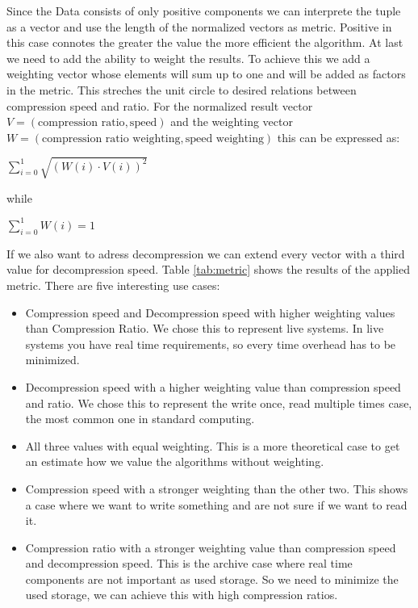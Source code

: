 \documentclass[
	12pt,
	a4paper,
	BCOR10mm,
	DIV14,
	listof=totoc,
	bibliography=totoc,
	headsepline
]{scrreprt}
\begin{document}
Since the Data consists of only positive components we can interprete the tuple as a vector and use the length of the normalized vectors as metric. 
Positive in this case connotes the greater the value the more efficient the algorithm.
At last we need to add the ability to weight the results. 
To achieve this we add a weighting vector whose elements will sum up to one and will be added as factors in the metric. 
This streches the unit circle to desired relations between compression speed and ratio.
For the normalized result vector \(V = (\text{compression ratio}, \text{speed})\) and the weighting vector \(W = (\text{compression ratio weighting}, \text{speed weighting})\) this can be expressed as:
\begin{center}
	\(
	\sum\limits^{1}_{i=0} \sqrt{(W(i) \cdot V(i))^2}
	\)
\end{center}
while
\begin{center}
	\(
	\sum\limits^{1}_{i=0}W(i) = 1
	\)
\end{center}
If we also want to adress decompression we can extend every vector with a third value for decompression speed.
Table \ref{tab:metric} shows the results of the applied metric.
There are five interesting use cases:
\begin{itemize}
	\item Compression speed and Decompression speed with higher weighting values than Compression Ratio.
	We chose this to represent live systems.  
	In live systems you have real time requirements, so every time overhead has to be minimized. 
	\\
	\item Decompression speed with a higher weighting value than compression speed and ratio.
	We chose this to represent the write once, read multiple times case, the most common one in standard computing.
	\item All three values with equal weighting.
	This is a more theoretical case to get an estimate how we value the algorithms without weighting.
	\\
	\item Compression speed with a stronger weighting than the other two.
	This shows a case where we want to write something and are not sure if we want to read it.
	\\
	\item Compression ratio with a stronger weighting value than compression speed and decompression speed.
	This is the archive case where real time components are not important as used storage.
	So we need to minimize the used storage, we can achieve this with high compression ratios.
\end{itemize}

\end{document}
